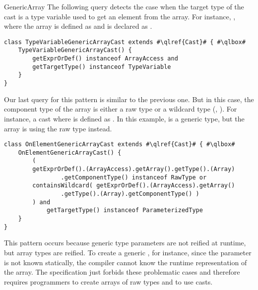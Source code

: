 \begin{pattern}{GenericArray}
The following query detects the case when the target type of the cast is a type variable used to get an element from the array.
For instance, ,
where the  array is defined as  and  is declared as .

\begin{listing}
\begin{verbatim}
class TypeVariableGenericArrayCast extends #\qlref{Cast}# { #\qlbox#
	TypeVariableGenericArrayCast() {
		getExprOrDef() instanceof ArrayAccess and
		getTargetType() instanceof TypeVariable
	}
}
\end{verbatim}
\end{listing}

Our last query for this pattern is similar to the previous one.
But in this case, the component type of the array is either a raw type or a wildcard type (\eg{}, ).
For instance, a cast  where  is defined as .
In this example,  is a generic type, but the array is using the raw type instead.

\begin{listing}
\begin{verbatim}
class OnElementGenericArrayCast extends #\qlref{Cast}# { #\qlbox#
	OnElementGenericArrayCast() {
		(
        getExprOrDef().(ArrayAccess).getArray().getType().(Array)
                .getComponentType() instanceof RawType or
        containsWildcard( getExprOrDef().(ArrayAccess).getArray()
                .getType().(Array).getComponentType() )
        ) and
            getTargetType() instanceof ParameterizedType
	}
}
\end{verbatim}
\end{listing}


\issues{}
This pattern occurs because generic type parameters are not reified at runtime,
but array types are reified.
To create a generic , for instance,
since the parameter  is not known statically,
the compiler cannot know the runtime representation of the array.
The \java{} specification just forbids these problematic cases and therefore requires programmers to create arrays of raw types and to use casts.

\end{pattern}
